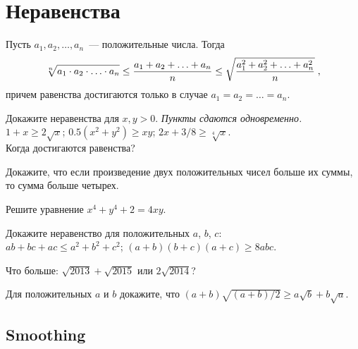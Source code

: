 
\section*{Неравенства}



Пусть $a_1, a_2, \ldots, a_n$~--- положительные числа.
Тогда
\[
    \sqrt[n]{\mathstrut
        a_1 \cdot a_2 \cdot \ldots \cdot a_n
    }
\leq
    \frac{
        a_1 + a_2 + \ldots + a_n
    }{n}
\leq
    \sqrt{\frac{
        a_1^2 + a_2^2 + \ldots + a_n^2
    }{n}}
\;,\]
причем равенства достигаются только в случае $a_1 = a_2 = \ldots = a_n$.

\begin{problems}

\item
Докажите неравенства для $x, y > 0$.
\emph{Пункты сдаются одновременно.}
\\[0.25ex]
\sp $1 + x \geq 2 \sqrt{x}$;
\quad
\sp $0.5 (x^2 + y^2) \geq x y$;
\quad
\sp $2 x + 3 / 8 \geq \sqrt[4]{x}$.
\\[0.25ex]
Когда достигаются равенства?

\item
Докажите, что если произведение двух положительных чисел больше их суммы, то
сумма больше четырех.

\item
Решите уравнение\enspace
$x^4 + y^4 + 2 = 4 x y$.

\item
Докажите неравенство для положительных $a$, $b$, $c$:
\\[0.3ex]
\sp $a b + b c + a c \leq a^2 + b^2 + c^2$;
\qquad
\sp $(a + b) (b + c) (a + c) \geq 8 a b c$.

\item
Что больше:\enspace
$\sqrt{2013} + \sqrt{2015}$\enspace
или\enspace
$2 \sqrt{2014}$?

\item
Для положительных $a$ и $b$ докажите, что\enspace
\(
    (a + b) \sqrt{(a + b) / 2}
\geq
    a \sqrt{b} + b \sqrt{a}
.\)

\end{problems}

\subsection*{Smoothing}

